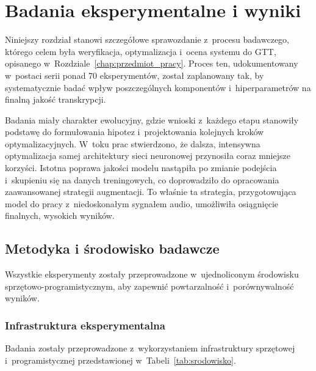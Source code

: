 \chapter{Badania eksperymentalne i wyniki}
\label{chap:badania}

Niniejszy rozdział stanowi szczegółowe sprawozdanie z~procesu badawczego, którego celem była weryfikacja, optymalizacja i~ocena systemu do GTT, opisanego w~Rozdziale~\ref{chap:przedmiot_pracy}. Proces ten, udokumentowany w~postaci serii ponad 70 eksperymentów, został zaplanowany tak, by systematycznie badać wpływ poszczególnych komponentów i~hiperparametrów na finalną jakość transkrypcji.

Badania miały charakter ewolucyjny, gdzie wnioski z~każdego etapu stanowiły podstawę do formułowania hipotez i~projektowania kolejnych kroków optymalizacyjnych. W~toku prac stwierdzono, że dalsza, intensywna optymalizacja samej architektury sieci neuronowej przynosiła coraz mniejsze korzyści. Istotna poprawa jakości modelu nastąpiła po zmianie podejścia i~skupieniu się na danych treningowych, co doprowadziło do opracowania zaawansowanej strategii augmentacji. To właśnie ta strategia, przygotowująca model do pracy z~niedoskonałym sygnałem audio, umożliwiła osiągnięcie finalnych, wysokich wyników.

\section{Metodyka i środowisko badawcze}
\label{sec:metodyka_srodowisko}

Wszystkie eksperymenty zostały przeprowadzone w~ujednoliconym środowisku sprzętowo-programistycznym, aby zapewnić powtarzalność i~porównywalność wyników.

\subsection{Infrastruktura eksperymentalna}
\label{ssec:infrastruktura}

Badania zostały przeprowadzone z~wykorzystaniem infrastruktury sprzętowej i~programistycznej przedstawionej w~Tabeli~\ref{tab:srodowisko}.

